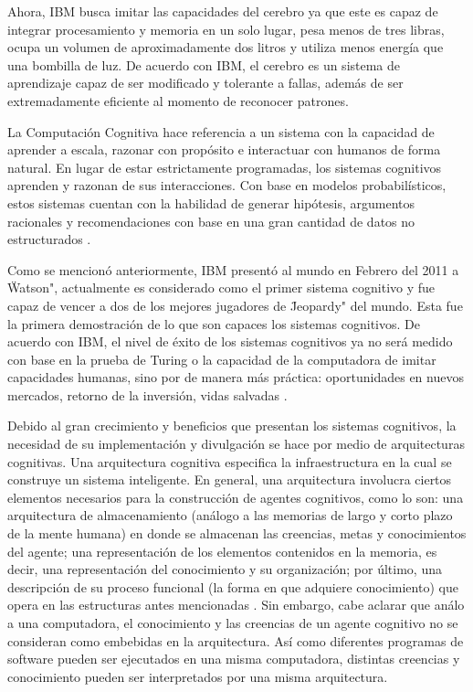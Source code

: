 Ahora, IBM busca imitar las capacidades del cerebro ya que este es capaz de integrar procesamiento y memoria en un solo lugar, pesa menos de tres libras, ocupa un volumen de aproximadamente dos litros y utiliza menos energ\'{i}a que una bombilla de luz. De acuerdo con IBM, el cerebro es un sistema de aprendizaje capaz de ser modificado y tolerante a fallas, adem\'{a}s de ser extremadamente eficiente al momento de reconocer patrones. 

La Computaci\'{o}n Cognitiva hace referencia a un sistema con la capacidad de aprender a escala, razonar con prop\'{o}sito e interactuar con humanos de forma natural. En lugar de estar estrictamente programadas, los sistemas cognitivos aprenden y razonan de sus interacciones. Con base en modelos probabil\'{i}sticos, estos sistemas cuentan con la habilidad de generar hip\'{o}tesis, argumentos racionales y recomendaciones con base en una gran cantidad de datos no estructurados \cite{ibmcc}.

Como se mencion\'{o} anteriormente, IBM present\'{o} al mundo en Febrero del 2011 a \"Watson", actualmente es considerado como el primer sistema cognitivo y fue capaz de vencer a dos de los mejores jugadores de \"Jeopardy" del mundo. Esta fue la primera demostraci\'{o}n de lo que son capaces los sistemas cognitivos. De acuerdo con IBM, el nivel de \'{e}xito de los sistemas cognitivos ya no ser\'{a} medido con base en la prueba de Turing o la capacidad de la computadora de imitar capacidades humanas, sino por de manera m\'{a}s pr\'{a}ctica: oportunidades en nuevos mercados, retorno de la inversi\'{o}n, vidas salvadas \cite{ibmcc}.

Debido al gran crecimiento y beneficios que presentan los sistemas cognitivos, la necesidad de su implementaci\'{o}n y divulgaci\'{o}n se hace por medio de arquitecturas cognitivas. Una arquitectura cognitiva especifica la infraestructura en la cual se construye un sistema inteligente. En general, una arquitectura involucra ciertos elementos necesarios para la construcci\'{o}n de agentes cognitivos, como lo son: una arquitectura de almacenamiento (an\'{a}logo a las memorias de largo y corto plazo de la mente humana) en donde se almacenan las creencias, metas y conocimientos del agente; una representaci\'{o}n de los elementos contenidos en la memoria, es decir, una representaci\'{o}n del conocimiento y su organizaci\'{o}n; por \'{u}ltimo, una descripci\'{o}n de su proceso funcional (la forma en que adquiere conocimiento) que opera en las estructuras antes mencionadas \cite{langley2009cognitive}. Sin embargo, cabe aclarar que an\'{a}lo a una computadora, el conocimiento y las creencias de un agente cognitivo no se consideran como embebidas en la arquitectura. As\'{i} como diferentes programas de software pueden ser ejecutados en una misma computadora, distintas creencias y conocimiento pueden ser interpretados por una misma arquitectura.

